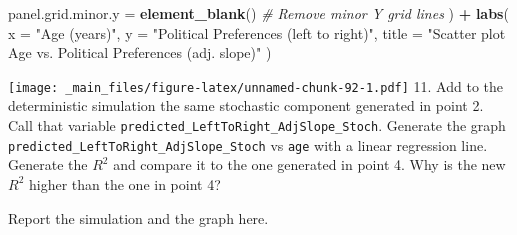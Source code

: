 \documentclass[
]{book}
\newenvironment{Shaded}{\begin{snugshade}}{\end{snugshade}}
\newcommand{\AttributeTok}[1]{\textcolor[rgb]{0.13,0.29,0.53}{#1}}
\newcommand{\CommentTok}[1]{\textcolor[rgb]{0.56,0.35,0.01}{\textit{#1}}}
\newcommand{\FunctionTok}[1]{\textcolor[rgb]{0.13,0.29,0.53}{\textbf{#1}}}
\newcommand{\NormalTok}[1]{#1}
\newcommand{\SpecialCharTok}[1]{\textcolor[rgb]{0.81,0.36,0.00}{\textbf{#1}}}
\newcommand{\StringTok}[1]{\textcolor[rgb]{0.31,0.60,0.02}{#1}}
\begin{document}
\begin{Shaded}
\begin{Highlighting}[]
    \AttributeTok{panel.grid.minor.y =} \FunctionTok{element\_blank}\NormalTok{() }\CommentTok{\# Remove minor Y grid lines}
\NormalTok{  ) }\SpecialCharTok{+}
  \FunctionTok{labs}\NormalTok{(}
    \AttributeTok{x =} \StringTok{"Age (years)"}\NormalTok{,}
    \AttributeTok{y =} \StringTok{"Political Preferences (left to right)"}\NormalTok{,}
    \AttributeTok{title =} \StringTok{"Scatter plot Age vs. Political Preferences (adj. slope)"}
\NormalTok{  )}
\end{Highlighting}
\end{Shaded}

\texttt{[image: \_main\_files/figure-latex/unnamed-chunk-92-1.pdf]}
11. Add to the deterministic simulation the same stochastic component generated in point 2. Call that variable \texttt{predicted\_LeftToRight\_AdjSlope\_Stoch}. Generate the graph \texttt{predicted\_LeftToRight\_AdjSlope\_Stoch} vs \texttt{age} with a linear regression line. Generate the \(R^2\) and compare it to the one generated in point 4. Why is the new \(R^2\) higher than the one in point 4?

Report the simulation and the graph here.
\end{document}
